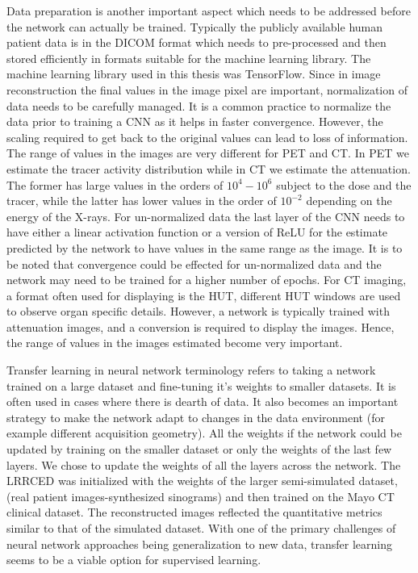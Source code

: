 Data preparation is another important aspect which needs to be addressed before the network can actually be trained. Typically the publicly available human patient data is in the DICOM format which needs to pre-processed and then stored efficiently in formats suitable for the machine learning library. The machine learning library used in this thesis was TensorFlow. Since in image reconstruction the final values in the image pixel are important, normalization of data needs to be carefully managed. It is a common practice to normalize the data prior to training a \ac{CNN} as it helps in faster convergence. However, the scaling required to get back to the original values can lead to loss of information. The range of values in the images are very different for \ac{PET} and \ac{CT}. In \ac{PET} we estimate the tracer activity distribution while in \ac{CT} we estimate the attenuation. The former has large values in the orders of $10^4-10^6$ subject to the dose and the tracer, while the latter has lower values in the order of $10^{-2}$ depending on the energy of the X-rays. For un-normalized data the last layer of the \ac{CNN} needs to have either a linear activation function or a version of ReLU for the estimate predicted by the network to have values in the same range as the image. It is to be noted that convergence could be effected for un-normalized data and the network may need to be trained for a higher number of epochs. For \ac{CT} imaging, a format often used for displaying is the HUT, different HUT windows are used to observe organ specific details. However, a network is typically trained with attenuation images, and a conversion is required to display the images. Hence, the range of values in the images estimated become very important.

Transfer learning in neural network terminology refers to taking a network trained on a large dataset and fine-tuning it's weights to smaller datasets. It is often used in cases where there is dearth of data. It also becomes an important strategy to make the network adapt to changes in the data environment (for example different acquisition geometry). All the weights if the network could be updated by training on the smaller dataset or only the weights of the last few layers. We chose to update the weights of all the layers across the network. The LRRCED was initialized with the weights of the larger semi-simulated dataset, (real patient images-synthesized sinograms) and then trained on the Mayo CT clinical dataset. The reconstructed images reflected the quantitative metrics similar to that of the simulated dataset. With one of the primary challenges of neural network approaches being generalization to new data, transfer learning seems to be a viable option for supervised learning. 

